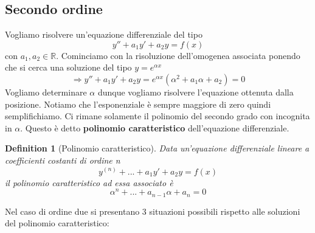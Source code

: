\documentclass[10pt,a4paper]{article}
\newtheorem{definition}{Definition}
\begin{document}
\subsection{Secondo ordine}
Vogliamo risolvere un'equazione differenziale del tipo
\[y'' + a_1 y' + a_2y = f(x)\]
con \(a_1, a_2 \in \mathbb{R}\). Cominciamo con la risoluzione dell'omogenea associata ponendo che si cerca una soluzione del tipo \(y = e^{\alpha x}\)
\[\Rightarrow y'' + a_1 y' + a_2 y = e^{\alpha x}(\alpha^2 + a_1 \alpha + a_2) = 0\]
Vogliamo determinare \(\alpha\) dunque vogliamo risolvere l'equazione ottenuta dalla posizione. Notiamo che l'esponenziale è sempre maggiore di zero quindi semplifichiamo. Ci rimane solamente il polinomio del secondo grado con incognita in $\alpha$. Questo è detto \textbf{polinomio caratteristico} dell'equazione differenziale.
\begin{definition}[Polinomio caratteristico]
	Data un'equazione differenziale lineare a coefficienti costanti di ordine n
	\[y^{(n)} +...+ a_1 y' + a_2y = f(x)\]
	il polinomio caratteristico ad essa associato è
	\[\alpha^n +...+a_{n-1}\alpha+a_n=0\]
\end{definition}
Nel caso di ordine due si presentano 3 situazioni possibili rispetto alle soluzioni del polinomio caratteristico:
\end{document}
